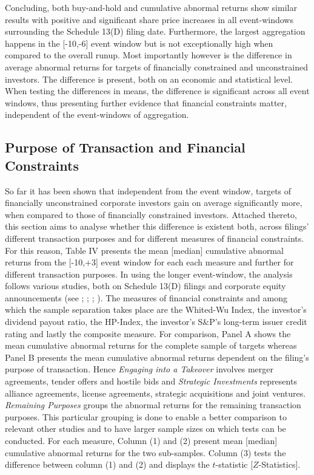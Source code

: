 \documentclass[12pt]{article}
\begin{document}
Concluding, both buy-and-hold and cumulative abnormal returns show similar results with positive and significant share price increases in all event-windows surrounding the Schedule 13(D) filing date. Furthermore, the largest aggregation happens in the [-10,-6] event window but is not exceptionally high when compared to the overall runup. Most importantly however is the difference in average abnormal returns for targets of financially constrained and unconstrained investors. The difference is present, both on an economic and statistical level. When testing the differences in means, the difference is significant across all event windows, thus presenting further evidence that financial constraints matter, independent of the event-windows of aggregation.

\subsection{Purpose of Transaction and Financial Constraints}

So far it has been shown that independent from the event window, targets of financially unconstrained corporate investors gain on average significantly more, when compared to those of financially constrained investors. Attached thereto, this section aims to analyse whether this difference is existent both, across filings' different transaction purposes and for different measures of financial constraints.\\
For this reason, Table IV presents the mean [median] cumulative abnormal returns from the [-10,+3] event window for each each measure and further for different transaction purposes. In using the longer event-window, the analysis follows various studies, both on Schedule 13(D) filings and corporate equity announcements (see \citet[p.369]{Greenwood2009}; \citet[p.210]{Klein2009}; \citet[p.1758]{Brav2008}; \citet[p.87]{Liao2014}). The measures of financial constraints and among which the sample separation takes place are the Whited-Wu Index, the investor's dividend payout ratio, the HP-Index, the investor's S\&P's long-term issuer credit rating and lastly the composite measure. For comparison, Panel A shows the mean cumulative abnormal returns for the complete sample of targets whereas Panel B presents the mean cumulative abnormal returns dependent on the filing's purpose of transaction. Hence \emph{Engaging into a Takeover} involves merger agreements, tender offers and hostile bids and \emph{Strategic Investments} represents alliance agreements, license agreements, strategic acquisitions and joint ventures. \emph{Remaining Purposes} groups the abnormal returns for the remaining transaction purposes. This particular grouping is done to enable a better comparison to relevant other studies and to have larger sample sizes on which tests can be conducted. For each measure, Column (1) and (2) present mean [median] cumulative abnormal returns for the two sub-samples. Column (3) tests the difference between column (1) and (2) and displays the  $t$-statistic [$Z$-Statistics].
\end{document}
